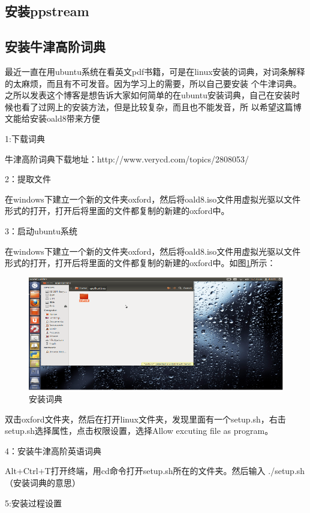 \subsection{安装ppstream}

\subsection{安装牛津高阶词典}
最近一直在用ubuntu系统在看英文pdf书籍，可是在linux安装的词典，对词条解释的太麻烦，而且有不可发音。因为学习上的需要，所以自己要安装 个牛津词典。之所以发表这个博客是想告诉大家如何简单的在ubuntu安装词典，自己在安装时候也看了过网上的安装方法，但是比较复杂，而且也不能发音，所 以希望这篇博文能给安装oald8带来方便

1:下载词典

牛津高阶词典下载地址：http://www.verycd.com/topics/2808053/

2：提取文件

在windows下建立一个新的文件夹oxford，然后将oald8.iso文件用虚拟光驱以文件形式的打开，打开后将里面的文件都复制的新建的oxford中。

3：启动ubuntu系统

在windows下建立一个新的文件夹oxford，然后将oald8.iso文件用虚拟光驱以文件形式的打开，打开后将里面的文件都复制的新建的oxford中。如图\ref{oxford}所示：
\begin{figure}
\centering\includegraphics[scale=0.7]{figures/oxford.png}
\caption{安装词典}\label{oxford}
\end{figure}


双击oxford文件夹，然后在打开linux文件夹，发现里面有一个setup.sh，右击setup.sh选择属性，点击权限设置，选择Allow excuting file as program。

4：安装牛津高阶英语词典

Alt+Ctrl+T打开终端，用cd命令打开setup.sh所在的文件夹。然后输入 ./setup.sh（安装词典的意思）

5:安装过程设置

